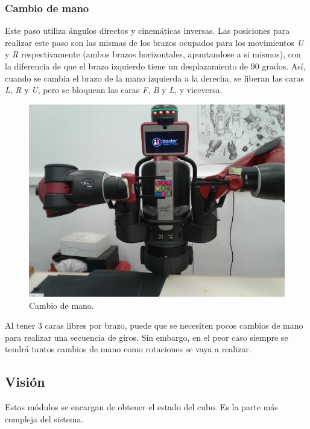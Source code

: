 \subsubsection{Cambio de mano}
Este paso utiliza ángulos directos y cinemáticas inversas. Las posiciones para realizar este paso son las mismas de los brazos ocupados para los movimientos \textit{U} y \textit{R} respectivamente (ambos brazos horizontales, apuntandose a si mismos), con la diferencia de que el brazo izquierdo tiene un desplazamiento de $90$ grados. Así, cuando se cambia el brazo de la mano izquierda a la derecha, se liberan las caras \textit{L}, \textit{R} y \textit{U}, pero se bloquean las caras \textit{F}, \textit{B} y \textit{L}, y viceversa.

\begin{figure}[h!]
	\centering
	\includegraphics[scale=0.1]{figures/switch}
	\caption{Cambio de mano.}
	\label{switch}
\end{figure}

Al tener 3 caras libres por brazo, puede que se necesiten pocos cambios de mano para realizar una secuencia de giros. Sin embargo, en el peor caso siempre se tendrá tantos cambios de mano como rotaciones se vaya a realizar.

\subsection{Visión}
Estos módulos se encargan de obtener el estado del cubo. Es la parte más compleja del sistema.
